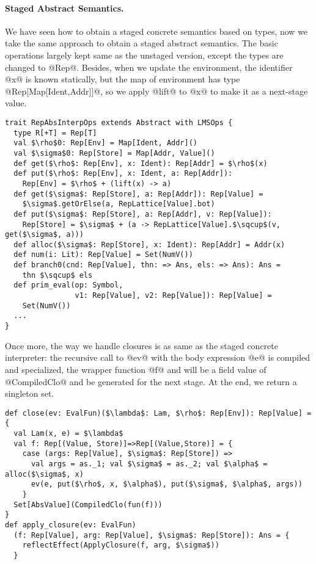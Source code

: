 \paragraph{Staged Abstract Semantics.} We have seen how to obtain a staged concrete semantics
based on types, now we take the same approach to obtain a staged abstract semantics.
The basic operations largely kept same as the unstaged version, except the types are changed to @Rep@.
Besides, when we update the environment, the identifier @x@ is known statically, but the map of environment
has type @Rep[Map[Ident,Addr]]@, so we apply @lift@ to @x@ to make it as a next-stage value.

\begin{lstlisting}
trait RepAbsInterpOps extends Abstract with LMSOps {
  type R[+T] = Rep[T]
  val $\rho$0: Rep[Env] = Map[Ident, Addr]()
  val $\sigma$0: Rep[Store] = Map[Addr, Value]()
  def get($\rho$: Rep[Env], x: Ident): Rep[Addr] = $\rho$(x)
  def put($\rho$: Rep[Env], x: Ident, a: Rep[Addr]): 
    Rep[Env] = $\rho$ + (lift(x) -> a)
  def get($\sigma$: Rep[Store], a: Rep[Addr]): Rep[Value] = 
    $\sigma$.getOrElse(a, RepLattice[Value].bot)
  def put($\sigma$: Rep[Store], a: Rep[Addr], v: Rep[Value]): 
    Rep[Store] = $\sigma$ + (a -> RepLattice[Value].$\sqcup$(v, get($\sigma$, a)))
  def alloc($\sigma$: Rep[Store], x: Ident): Rep[Addr] = Addr(x)
  def num(i: Lit): Rep[Value] = Set(NumV())
  def branch0(cnd: Rep[Value], thn: => Ans, els: => Ans): Ans =
    thn $\sqcup$ els
  def prim_eval(op: Symbol, 
                v1: Rep[Value], v2: Rep[Value]): Rep[Value] = 
    Set(NumV())
  ...
}
\end{lstlisting}

Once more, the way we handle closures is as same as the staged concrete interpreter:
the recursive call to @ev@ with the body expression @e@ is compiled and specialized, 
the wrapper function @f@ and will be a field value of @CompiledClo@ and be generated
for the next stage. At the end, we return a singleton set.

\begin{lstlisting}
def close(ev: EvalFun)($\lambda$: Lam, $\rho$: Rep[Env]): Rep[Value] = {
  val Lam(x, e) = $\lambda$
  val f: Rep[(Value, Store)]=>Rep[(Value,Store)] = {
    case (args: Rep[Value], $\sigma$: Rep[Store]) =>
      val args = as._1; val $\sigma$ = as._2; val $\alpha$ = alloc($\sigma$, x)
      ev(e, put($\rho$, x, $\alpha$), put($\sigma$, $\alpha$, args))
    }
  Set[AbsValue](CompiledClo(fun(f)))
}
def apply_closure(ev: EvalFun)
  (f: Rep[Value], arg: Rep[Value], $\sigma$: Rep[Store]): Ans = {
    reflectEffect(ApplyClosure(f, arg, $\sigma$))
  }
\end{lstlisting}

